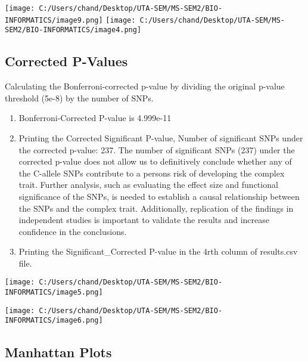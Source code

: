 \documentclass[
]{article}
\begin{document}
\texttt{[image: C:/Users/chand/Desktop/UTA-SEM/MS-SEM2/BIO-INFORMATICS/image9.png]}
\texttt{[image: C:/Users/chand/Desktop/UTA-SEM/MS-SEM2/BIO-INFORMATICS/image4.png]}

\hypertarget{section}{%
\subsection{}\label{section}}

\hypertarget{corrected-p-values}{%
\subsection{\texorpdfstring{\textbf{Corrected
P-Values}}{Corrected P-Values}}\label{corrected-p-values}}

Calculating the Bonferroni-corrected p-value by dividing the original
p-value threshold (5e-8) by the number of SNPs.

\begin{enumerate}
\def\labelenumi{\alph{enumi})}
\item
  Bonferroni-Corrected P-value is 4.999e-11
\item
  Printing the Corrected Significant P-value, Number of significant SNPs
  under the corrected p-value: 237. The number of significant SNPs (237)
  under the corrected p-value does not allow us to definitively conclude
  whether any of the C-allele SNPs contribute to a
  person\textquotesingle s risk of developing the complex trait. Further
  analysis, such as evaluating the effect size and functional
  significance of the SNPs, is needed to establish a causal relationship
  between the SNPs and the complex trait. Additionally, replication of
  the findings in independent studies is important to validate the
  results and increase confidence in the conclusions.
\item
  Printing the Significant\_Corrected P-value in the 4rth column of
  results.csv file.
\end{enumerate}

\texttt{[image: C:/Users/chand/Desktop/UTA-SEM/MS-SEM2/BIO-INFORMATICS/image5.png]}

\texttt{[image: C:/Users/chand/Desktop/UTA-SEM/MS-SEM2/BIO-INFORMATICS/image6.png]}

\hypertarget{manhattan-plots}{%
\subsection{\texorpdfstring{\textbf{Manhattan
Plots}}{Manhattan Plots}}\label{manhattan-plots}}
\end{document}
